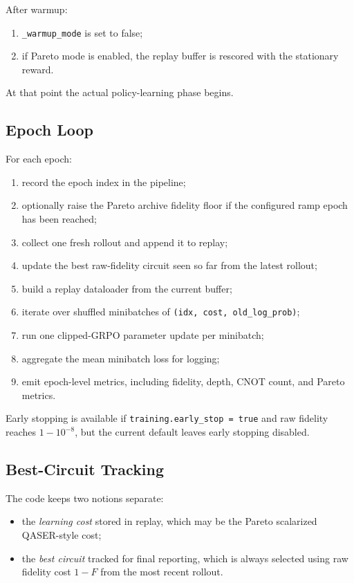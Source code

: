 \documentclass[11pt]{article}
\begin{document}
After warmup:
\begin{enumerate}[leftmargin=*]
\item \texttt{\_warmup\_mode} is set to false;
\item if Pareto mode is enabled, the replay buffer is rescored with the stationary reward.
\end{enumerate}

At that point the actual policy-learning phase begins.

\subsection{Epoch Loop}

For each epoch:
\begin{enumerate}[leftmargin=*]
\item record the epoch index in the pipeline;
\item optionally raise the Pareto archive fidelity floor if the configured ramp epoch has been reached;
\item collect one fresh rollout and append it to replay;
\item update the best raw-fidelity circuit seen so far from the latest rollout;
\item build a replay dataloader from the current buffer;
\item iterate over shuffled minibatches of \texttt{(idx, cost, old\_log\_prob)};
\item run one clipped-GRPO parameter update per minibatch;
\item aggregate the mean minibatch loss for logging;
\item emit epoch-level metrics, including fidelity, depth, CNOT count, and Pareto metrics.
\end{enumerate}

Early stopping is available if \texttt{training.early\_stop = true} and raw fidelity reaches $1 - 10^{-8}$, but the current default leaves early stopping disabled.

\subsection{Best-Circuit Tracking}

The code keeps two notions separate:
\begin{itemize}[leftmargin=*]
\item the \emph{learning cost} stored in replay, which may be the Pareto scalarized QASER-style cost;
\item the \emph{best circuit} tracked for final reporting, which is always selected using raw fidelity cost $1-F$ from the most recent rollout.
\end{itemize}
\end{document}
